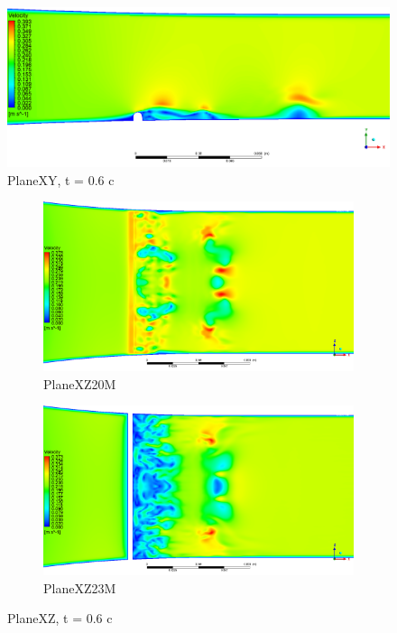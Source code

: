\appendix
{}
\setcounter{figure}{0}
\begin{figure}[H]
	\centering
	\includegraphics[width=0.9\linewidth]{../Assets/T0_Velocity_ContourXY}
	\caption{PlaneXY, t = 0.6 c}
	\label{fig:t0velocitycontourxy}
\end{figure}
\begin{figure}[H]
	\begin{subfigure}{.5\textwidth}
		\centering
		\includegraphics[width=1.7\linewidth, angle=90]{../Assets/T0_Velocity_ContourXZ20M}
		\caption{PlaneXZ20M}
		\label{fig:t0velocitycontourxz20m}
	\end{subfigure}%
	\begin{subfigure}{.5\textwidth}
		\centering
		\includegraphics[width=1.7\linewidth, angle=90]{../Assets/T0_Velocity_ContourXZ23M}
		\caption{PlaneXZ23M}
		\label{fig:t0velocitycontourxz23m}
	\end{subfigure}
		\caption{PlaneXZ, t = 0.6 c}
		\label{fig:t0velocitycontourxz}
\end{figure}
